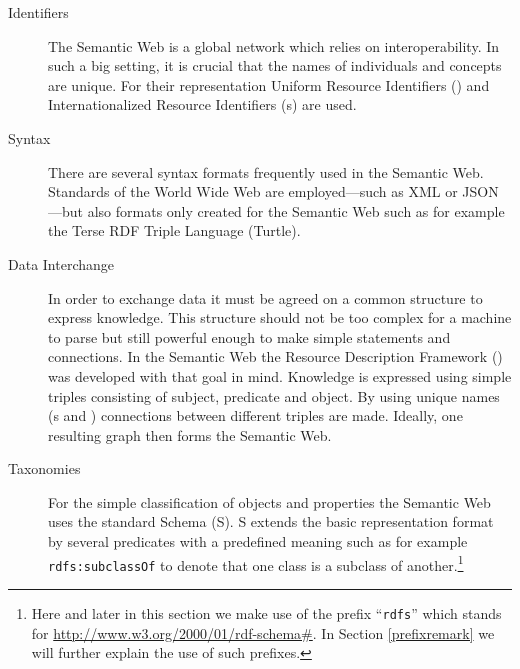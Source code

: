 \begin{description}
 \item[Identifiers] The Semantic Web is a global network which relies on interoperability. In such a big setting, it is crucial that the names of individuals and concepts are unique.
 For their representation Uniform Resource Identifiers (\uris) and Internationalized Resource Identifiers (\iri{}s) are used.  
 \item[Syntax] There are several syntax formats frequently used in the Semantic Web. Standards of the World Wide Web are employed---such as XML or JSON---but also formats 
 only created for the Semantic Web such as for example the Terse RDF Triple Language (Turtle). 
 \item[Data Interchange]
In order to exchange data it must be agreed on  a common structure to express knowledge. This 
structure should not be too complex for a machine to parse but still 
powerful enough to make simple statements and connections. 
In the Semantic Web the Resource Description Framework (\rdf) was developed with 
that goal in mind. Knowledge is expressed using simple triples consisting of subject,
predicate and object. By using unique names (\iri{}s and \uris) connections between different triples are made. 
Ideally, one resulting graph then forms the Semantic Web.
 \item[Taxonomies] For the simple classification of objects and properties the Semantic Web uses the standard \rdf Schema (\rdf{}S). \rdf{}S extends the basic representation format 
 \rdf by several predicates with a predefined meaning such as for example \texttt{rdfs:subclassOf} to denote that one class is a subclass of another.\footnote{
Here and later in this section we make use of the prefix 
``\texttt{rdfs}'' which stands for  \url{http://www.w3.org/2000/01/rdf-schema\#}.
In Section \ref{prefixremark} we will further explain the use of such prefixes.
}
\end{description}
